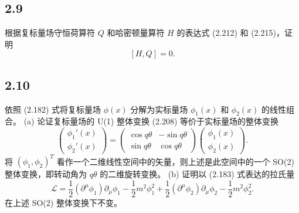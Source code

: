 \newpage
\subsection{2.9}
根据复标量场守恒荷算符 $Q$ 和哈密顿量算符 $H$ 的表达式 (2.212) 和 (2.215)，证明
$$[H, Q] = 0. \tag{2.235}$$

\newpage
\subsection{2.10}
依照 (2.182) 式将复标量场 $\phi(x)$ 分解为实标量场 $\phi_1(x)$ 和 $\phi_2(x)$ 的线性组合。
(a) 论证复标量场的 U(1) 整体变换 (2.208) 等价于实标量场的整体变换
$$\begin{pmatrix}
\phi_1'(x) \\
\phi_2'(x)
\end{pmatrix}
=
\begin{pmatrix}
\cos q\theta & -\sin q\theta \\
\sin q\theta & \cos q\theta
\end{pmatrix}
\begin{pmatrix}
\phi_1(x) \\
\phi_2(x)
\end{pmatrix}. \tag{2.236}$$
将 $(\phi_1, \phi_2)^T$ 看作一个二维线性空间中的矢量，则上述是此空间中的一个 SO(2) 整体变换，即转动角为 $q\theta$ 的二维旋转变换。
(b) 证明以 (2.183) 式表达的拉氏量
$$\mathcal{L} = \frac{1}{2} (\partial^\mu \phi_1) \partial_\mu \phi_1 - \frac{1}{2} m^2 \phi_1^2 + \frac{1}{2} (\partial^\mu \phi_2) \partial_\mu \phi_2 - \frac{1}{2} m^2 \phi_2^2. \tag{2.237}$$
在上述 SO(2) 整体变换下不变。

